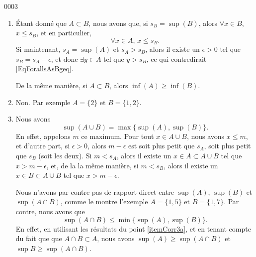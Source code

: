 
\begin{corrige}{0003}

\begin{enumerate}
\item\label{itemCorr3a} Étant donné que $A\subset B$, nous avons que, si $s_B=\sup(B)$, alors $\forall x\in B$, $x\leq s_B$, et en particulier,
\begin{equation}		\label{EqForallsAsBgeq}
	\forall x\in A,\, x\leq s_B.
\end{equation}
Si maintenant, $s_A=\sup(A)$ et $s_A>s_B$, alors il existe un $\epsilon>0$ tel que $s_B=s_A-\epsilon$, et donc $\exists y\in A$ tel que $y>s_B$, ce qui contredirait \eqref{EqForallsAsBgeq}.

De la même manière, si $A\subset B$, alors $\inf(A)\geq \inf(B)$.

\item Non. Par exemple $A=\{ 2 \}$ et $B=\{ 1,2 \}$.

\item Nous avons
\begin{equation}
	\sup(A\cup B)=\max\{ \sup(A),\sup(B) \}.
\end{equation}
En effet, appelons $m$ ce maximum. Pour tout $x\in A\cup B$, nous avons $x\leq m$, et d'autre part, si $\epsilon>0$, alors $m-\epsilon$ est soit plus petit que $s_A$, soit plus petit que $s_B$ (soit les deux). Si $m<s_A$, alors il existe un $x\in A\subset A\cup B$ tel que $x>m-\epsilon$, et, de la la même manière, si $m<s_B$, alors il existe un $x\in B\subset A\cup B$ tel que $x>m-\epsilon$. 

Nous n'avons par contre pas de rapport direct entre $\sup(A)$, $\sup(B)$ et $\sup(A\cap B)$, comme le montre l'exemple $A=\{ 1,5 \}$ et $B=\{ 1,7 \}$. Par contre, nous avons que
\begin{equation}
	\sup(A\cap B)\leq\min\{ \sup(A),\sup(B) \}.
\end{equation}
En effet, en utilisant les résultats du point \ref{itemCorr3a}, et en tenant compte du fait que que $A\cap B\subset A$, nous avons $\sup(A)\geq\sup(A\cap B)$ et $\sup B\geq\sup(A\cap B)$.
\end{enumerate}

\end{corrige}
